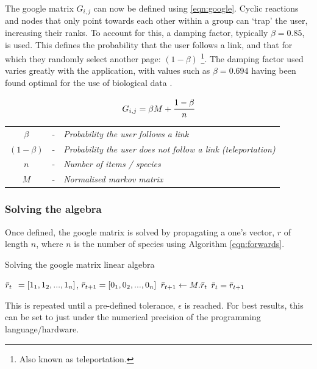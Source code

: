 The google matrix $G_{i,j}$ can now be defined using \autoref{eqn:google}.
 Cyclic reactions and nodes that only point towards each other within a group can `trap' the user, increasing their ranks. 
 To account for this, a damping factor, typically $\beta = 0.85$, is used. This defines the probability that the user follows a link, and that for which they randomly select another page: $(1-\beta)$ \footnote{Also known as teleportation.}. The damping factor used varies greatly with the application, with values such as $\beta = 0.694$ having been found optimal for the use of biological data \citep{biopr}.


\begin{center}
\begin{equation}
     G_{i,j} = \beta M + \cfrac{1 - \beta}{n}
 \label{eqn:google}
\end{equation}
\begin{tabular}{ccl}
$\beta$&-&\textit{Probability the user follows a link} \\
 $(1 - \beta)$&-&\textit{Probability the user does not follow a link (teleportation)} \\
$n$&-&\textit{Number of items / species}\\
$M$&-&\textit{Normalised markov matrix}
\end{tabular}
\end{center}


\subsubsection{Solving the algebra}

Once defined, the google matrix is solved by propagating a one's vector, $r$ of length $n$, where $n$ is the number of species using Algorithm \ref{eqn:forwards}.


\begin{algorithm} \caption{Solving the google matrix linear algebra}
\begin{algorithmic}[1]
\State  $\Bar{r}_t \:\:= [1_1, 1_2, ... , 1_n]$, $\Bar{r}_{t+1} = [0_1, 0_2, ... , 0_n]$
\State
{}
\State $\Bar{r}_{t+1} \gets M . \Bar{r}_t$
\State $\Bar{r}_t = \Bar{r}_{t+1}$
\EndWhile
\end{algorithmic}\label{eqn:forwards}
\end{algorithm}


 This is repeated until a pre-defined tolerance, $\epsilon$ is reached. For best results, this can be set to just under the numerical precision of the programming language/hardware. 


